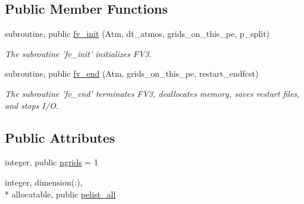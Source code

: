 \subsection*{Public Member Functions}
\begin{DoxyCompactItemize}
\item 
subroutine, public \hyperlink{classfv__control__mod_ad626f01c20738f5101fb5f64e5d3dcfe}{fv\-\_\-init} (Atm, dt\-\_\-atmos, grids\-\_\-on\-\_\-this\-\_\-pe, p\-\_\-split)
\begin{DoxyCompactList}\small\item\em The subroutine 'fv\-\_\-init' initializes F\-V3. \end{DoxyCompactList}\item 
subroutine, public \hyperlink{classfv__control__mod_a8478437752b9d21f6d2f936c8b65284c}{fv\-\_\-end} (Atm, grids\-\_\-on\-\_\-this\-\_\-pe, restart\-\_\-endfcst)
\begin{DoxyCompactList}\small\item\em The subroutine 'fv\-\_\-end' terminates F\-V3, deallocates memory, saves restart files, and stops I/\-O. \end{DoxyCompactList}\end{DoxyCompactItemize}
\subsection*{Public Attributes}
\begin{DoxyCompactItemize}
\item 
integer, public \hyperlink{classfv__control__mod_abaa40fc70569bf400e1385f95bae1f5f}{ngrids} = 1
\item 
integer, dimension(\-:), \\*
allocatable, public \hyperlink{classfv__control__mod_acb8e6baca36aa5140d2d15258e1cf1d6}{pelist\-\_\-all}
\end{DoxyCompactItemize}
